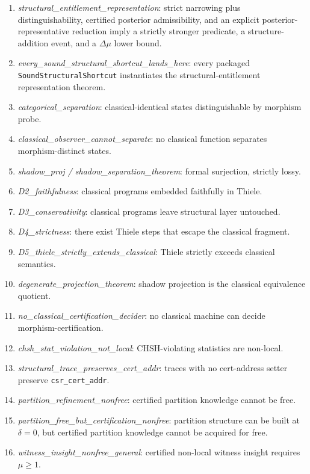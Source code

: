 \documentclass[11pt,a4paper]{article}
\theoremstyle{plain}
\theoremstyle{definition}
\theoremstyle{remark}
\begin{document}
{\begin{enumerate}
\item \textit{\small structural\_entitlement\_representation}: strict narrowing plus distinguishability, certified posterior admissibility, and an explicit posterior-representative reduction imply a strictly stronger predicate, a structure-addition event, and a $\Delta\mu$ lower bound.
\item \textit{\small every\_sound\_structural\_shortcut\_lands\_here}: every packaged \texttt{SoundStructuralShortcut} instantiates the structural-entitlement representation theorem.
\item \textit{\small categorical\_separation}: classical-identical states distinguishable by morphism probe.
\item \textit{\small classical\_observer\_cannot\_separate}: no classical function separates morphism-distinct states.
\item \textit{\small shadow\_proj / shadow\_separation\_theorem}: formal surjection, strictly lossy.
\item \textit{\small D2\_faithfulness}: classical programs embedded faithfully in Thiele.
\item \textit{\small D3\_conservativity}: classical programs leave structural layer untouched.
\item \textit{\small D4\_strictness}: there exist Thiele steps that escape the classical fragment.
\item \textit{\small D5\_thiele\_strictly\_extends\_classical}: Thiele strictly exceeds classical semantics.
\item \textit{\small degenerate\_projection\_theorem}: shadow projection is the classical equivalence quotient.
\item \textit{\small no\_classical\_certification\_decider}: no classical machine can decide morphism-certification.
\item \textit{\small chsh\_stat\_violation\_not\_local}: CHSH-violating statistics are non-local.
\item \textit{\small structural\_trace\_preserves\_cert\_addr}: traces with no cert-address setter preserve \texttt{csr\_cert\_addr}.
\item \textit{\small partition\_refinement\_nonfree}: certified partition knowledge cannot be free.
\item \textit{\small partition\_free\_but\_certification\_nonfree}: partition structure can be built at $\delta=0$, but certified partition knowledge cannot be acquired for free.
\item \textit{\small witness\_insight\_nonfree\_general}: certified non-local witness insight requires $\mu \geq 1$.

\end{enumerate}}
\end{document}
